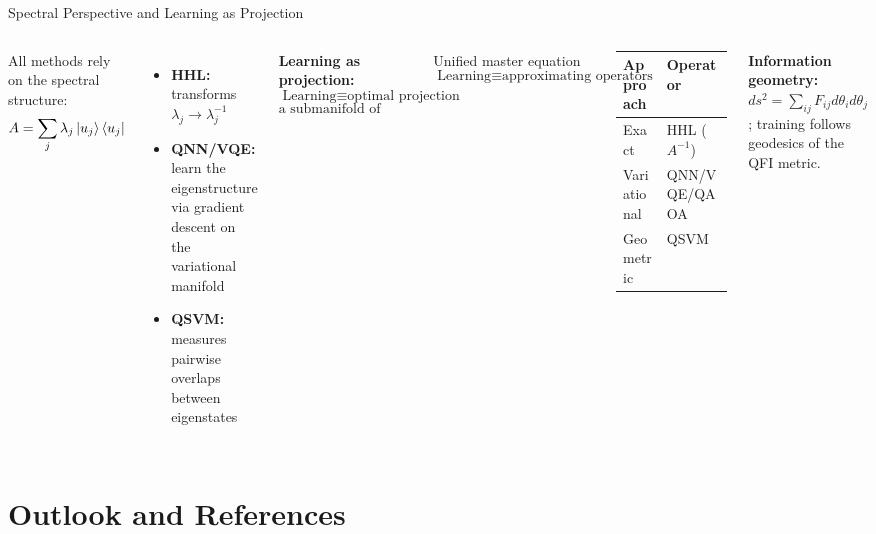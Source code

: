 \documentclass[aspectratio=169,10pt]{beamer}
\begin{document}
\begin{frame}{Spectral Perspective and Learning as Projection}
  \begin{columns}[T]
      All methods rely on the spectral structure:
      \[
        A = \sum_j\lambda_j\ket{u_j}\bra{u_j}
      \]
      \begin{itemize}
        \item \textbf{HHL:} transforms $\lambda_j\to\lambda_j^{-1}$
        \item \textbf{QNN/VQE:} learn the eigenstructure via
              gradient descent on the variational manifold
        \item \textbf{QSVM:} measures pairwise overlaps between
              eigenstates
      \end{itemize}

      \medskip
      \textbf{Learning as projection:}
      \[
        \text{Learning}\equiv\text{optimal projection onto}
      \]
      \[
        \text{a submanifold of Hilbert space}
      \]
      \begin{alertblock}{Unified master equation}
        \[
          \boxed{
            \text{Learning}\equiv
            \text{approximating operators}
          }
        \]
      \end{alertblock}
      \vspace{0.3cm}
      \begin{tabular}{ll}
        \toprule
        Approach & Operator \\
        \midrule
        Exact & HHL ($A^{-1}$) \\
        Variational & QNN/VQE/QAOA \\
        Geometric & QSVM \\
        \bottomrule
      \end{tabular}
      \vspace{0.3cm}

      \textbf{Information geometry:}
      $ds^2=\sum_{ij}F_{ij}d\theta_id\theta_j$;
      training follows geodesics of the QFI metric.
  \end{columns}
\end{frame}

\section{Outlook and References}
\end{document}
